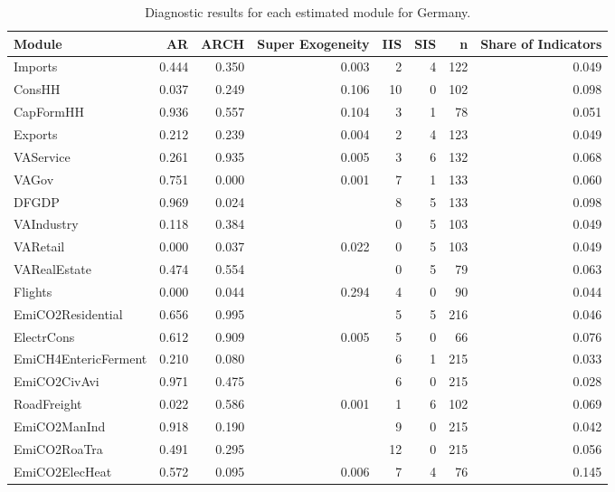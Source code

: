 \begin{table}
\centering
\caption{\label{tab:DE_diagnostics}Diagnostic results for each estimated module for Germany.}
\centering
\begin{tabular}[t]{lrrrrrrr}
\toprule
Module & AR & ARCH & Super Exogeneity & IIS & SIS & n & Share of Indicators\\
\midrule
Imports & 0.444 & 0.350 & 0.003 & 2 & 4 & 122 & 0.049\\
ConsHH & 0.037 & 0.249 & 0.106 & 10 & 0 & 102 & 0.098\\
CapFormHH & 0.936 & 0.557 & 0.104 & 3 & 1 & 78 & 0.051\\
Exports & 0.212 & 0.239 & 0.004 & 2 & 4 & 123 & 0.049\\
VAService & 0.261 & 0.935 & 0.005 & 3 & 6 & 132 & 0.068\\
\addlinespace
VAGov & 0.751 & 0.000 & 0.001 & 7 & 1 & 133 & 0.060\\
DFGDP & 0.969 & 0.024 &  & 8 & 5 & 133 & 0.098\\
VAIndustry & 0.118 & 0.384 &  & 0 & 5 & 103 & 0.049\\
VARetail & 0.000 & 0.037 & 0.022 & 0 & 5 & 103 & 0.049\\
VARealEstate & 0.474 & 0.554 &  & 0 & 5 & 79 & 0.063\\
\addlinespace
Flights & 0.000 & 0.044 & 0.294 & 4 & 0 & 90 & 0.044\\
EmiCO2Residential & 0.656 & 0.995 &  & 5 & 5 & 216 & 0.046\\
ElectrCons & 0.612 & 0.909 & 0.005 & 5 & 0 & 66 & 0.076\\
EmiCH4EntericFerment & 0.210 & 0.080 &  & 6 & 1 & 215 & 0.033\\
EmiCO2CivAvi & 0.971 & 0.475 &  & 6 & 0 & 215 & 0.028\\
\addlinespace
RoadFreight & 0.022 & 0.586 & 0.001 & 1 & 6 & 102 & 0.069\\
EmiCO2ManInd & 0.918 & 0.190 &  & 9 & 0 & 215 & 0.042\\
EmiCO2RoaTra & 0.491 & 0.295 &  & 12 & 0 & 215 & 0.056\\
EmiCO2ElecHeat & 0.572 & 0.095 & 0.006 & 7 & 4 & 76 & 0.145\\
\bottomrule
\end{tabular}
\end{table}

